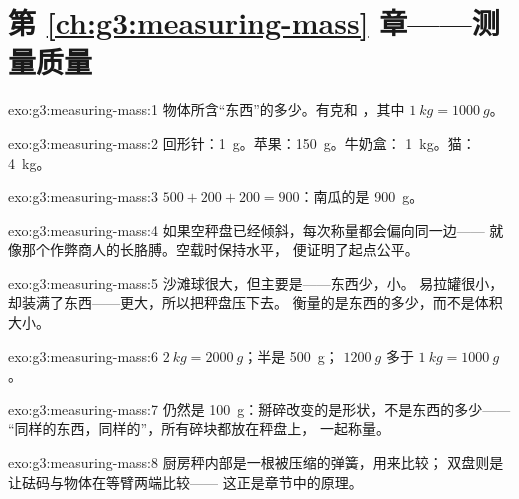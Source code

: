 \section*{第 \ref{ch:g3:measuring-mass} 章——测量质量}

\begin{solution}{exo:g3:measuring-mass:1}
物体所含“东西”的多少。有克和
，其中 $\qty{1}{kg} = \qty{1000}{g}$。
\end{solution}

\begin{solution}{exo:g3:measuring-mass:2}
回形针：\qty{1}{g}。苹果：\qty{150}{g}。牛奶盒：
\qty{1}{kg}。猫：\qty{4}{kg}。
\end{solution}

\begin{solution}{exo:g3:measuring-mass:3}
$500 + 200 + 200 = 900$：南瓜的是 \qty{900}{g}。
\end{solution}

\begin{solution}{exo:g3:measuring-mass:4}
如果空秤盘已经倾斜，每次称量都会偏向同一边——
就像那个作弊商人的长胳膊。空载时保持水平，
便证明了起点公平。
\end{solution}

\begin{solution}{exo:g3:measuring-mass:5}
沙滩球很大，但主要是——东西少，小。
易拉罐很小，却装满了东西——更大，所以把秤盘压下去。
衡量的是东西的多少，而不是体积大小。
\end{solution}

\begin{solution}{exo:g3:measuring-mass:6}
$\qty{2}{kg} = \qty{2000}{g}$；半是 \qty{500}{g}；
$\qty{1200}{g}$ 多于 $\qty{1}{kg} = \qty{1000}{g}$。
\end{solution}

\begin{solution}{exo:g3:measuring-mass:7}
仍然是 \qty{100}{g}：掰碎改变的是形状，不是东西的多少——
“同样的东西，同样的”，所有碎块都放在秤盘上，
一起称量。
\end{solution}

\begin{solution}{exo:g3:measuring-mass:8}
厨房秤内部是一根被压缩的弹簧，用来比较；
双盘则是让砝码与物体在等臂两端比较——
这正是章节中的原理。
\end{solution}


